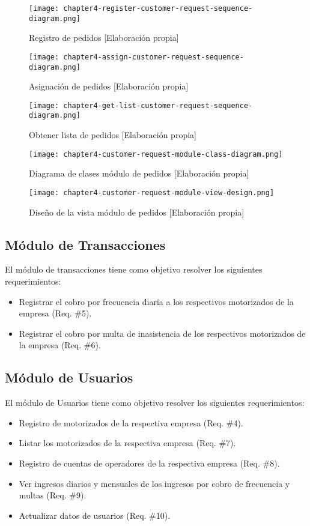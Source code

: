\begin{figure}[H]
  \centering
  \texttt{[image: chapter4-register-customer-request-sequence-diagram.png]}
  \caption{Registro de pedidos [Elaboración propia]}  
\end{figure}

\begin{figure}[H]
  \centering
  \texttt{[image: chapter4-assign-customer-request-sequence-diagram.png]}
  \caption{Asignación de pedidos [Elaboración propia]}  
\end{figure}

\begin{figure}[H]
  \centering
  \texttt{[image: chapter4-get-list-customer-request-sequence-diagram.png]}
  \caption{Obtener lista de pedidos [Elaboración propia]}  
\end{figure}


\begin{figure}[H]
  \centering
  \texttt{[image: chapter4-customer-request-module-class-diagram.png]}
  \caption{Diagrama de clases módulo de pedidos [Elaboración propia]}  
\end{figure}

\begin{figure}[H]
  \centering
  \texttt{[image: chapter4-customer-request-module-view-design.png]}
  \caption{Diseño de la vista módulo de pedidos [Elaboración propia]}  
\end{figure}

\subsection{Módulo de Transacciones}
El módulo de transacciones tiene como objetivo resolver los siguientes requerimientos:
\begin{itemize}
\item Registrar el cobro por frecuencia diaria a los respectivos motorizados de la empresa (Req. \#5).
\item Registrar el cobro por multa de inasistencia de los respectivos motorizados de la empresa (Req. \#6).
\end{itemize}
\subsection{Módulo de Usuarios}
El módulo de Usuarios tiene como objetivo resolver los siguientes requerimientos:
\begin{itemize}
\item Registro de motorizados de la respectiva empresa (Req. \#4).
\item Listar los motorizados de la respectiva empresa (Req. \#7).
\item Registro de cuentas de operadores de la respectiva empresa (Req. \#8).
\item Ver ingresos diarios y mensuales de los ingresos por cobro de frecuencia y multas (Req. \#9).
\item Actualizar datos de usuarios (Req. \#10).
\end{itemize}
